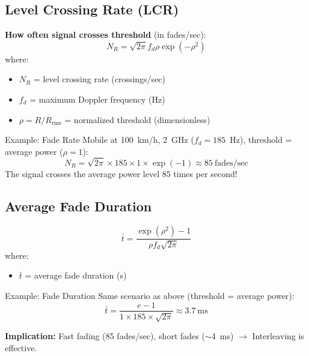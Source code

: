 \subsection{Level Crossing Rate (LCR)}

\textbf{How often signal crosses threshold} (in fades/sec):
\begin{equation}
N_R = \sqrt{2\pi} f_d \rho \exp(-\rho^2)
\label{eq:level-crossing-rate}
\end{equation}
where:
\begin{itemize}
\item $N_R$ = level crossing rate (crossings/sec)
\item $f_d$ = maximum Doppler frequency (Hz)
\item $\rho = R/R_{\text{rms}}$ = normalized threshold (dimensionless)
\end{itemize}

\begin{calloutbox}{Example: Fade Rate}
Mobile at 100~km/h, 2~GHz ($f_d = 185$~Hz), threshold = average power ($\rho = 1$):
\begin{equation*}
N_R = \sqrt{2\pi} \times 185 \times 1 \times \exp(-1) \approx 85~\text{fades/sec}
\end{equation*}
The signal crosses the average power level 85 times per second!
\end{calloutbox}

\subsection{Average Fade Duration}

\begin{equation}
\bar{t} = \frac{\exp(\rho^2) - 1}{\rho f_d \sqrt{2\pi}}
\label{eq:average-fade-duration}
\end{equation}
where:
\begin{itemize}
\item $\bar{t}$ = average fade duration (s)
\end{itemize}

\begin{calloutbox}{Example: Fade Duration}
Same scenario as above (threshold = average power):
\begin{equation*}
\bar{t} = \frac{e - 1}{1 \times 185 \times \sqrt{2\pi}} \approx 3.7~\text{ms}
\end{equation*}

\textbf{Implication:} Fast fading (85 fades/sec), short fades ($\sim$4~ms) $\rightarrow$ Interleaving is effective.
\end{calloutbox}

